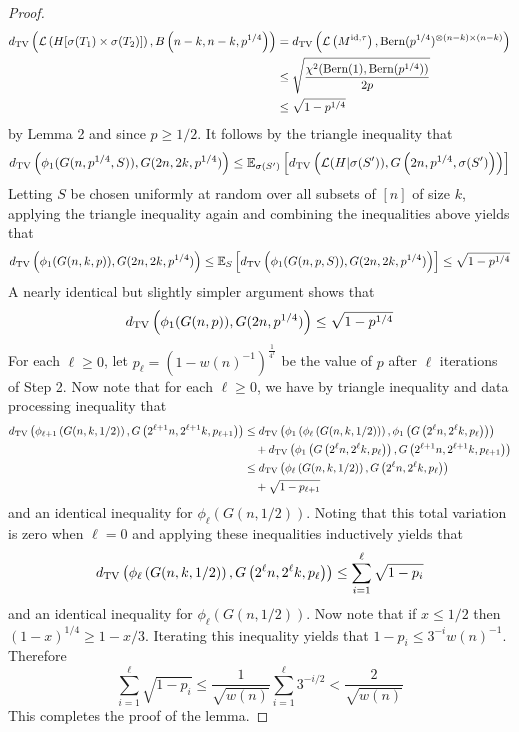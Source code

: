 \documentclass[11pt]{article}
\begin{document}
\begin{proof}
\begin{align*}
d_{\text{TV}}\left( \mathcal{L}\left(H[\sigma(T_1) \times \sigma(T_2)]\right), B\left(n - k, n - k, p^{1/4}\right) \right) &= d_{\text{TV}}\left( \mathcal{L}\left( M^{\text{id}, \tau} \right), \text{Bern}(p^{1/4})^{\otimes(n-k) \times (n-k)} \right) \\
&\le \sqrt{\frac{\chi^2(\text{Bern}(1), \text{Bern}(p^{1/4}))}{2p}} \\
&\le \sqrt{1-p^{1/4}}
\end{align*}
by Lemma 2 and since $p \ge 1/2$. It follows by the triangle inequality that
$$d_{\text{TV}}\left( \phi_1(G(n, p^{1/4}, S)), G(2n, 2k, p^{1/4}) \right) \le \mathbb{E}_{\sigma(S')} \left[ d_{\text{TV}}\left(\mathcal{L}(H | \sigma(S')), G\left(2n, p^{1/4}, \sigma(S')\right) \right) \right]$$
Letting $S$ be chosen uniformly at random over all subsets of $[n]$ of size $k$, applying the triangle inequality again and combining the inequalities above yields that
$$d_{\text{TV}}\left( \phi_1(G(n, k, p)), G(2n, 2k, p^{1/4}) \right) \le \mathbb{E}_S\left[ d_{\text{TV}}\left( \phi_1(G(n, p, S)), G(2n, 2k, p^{1/4}) \right) \right] \le\sqrt{1-p^{1/4}}$$
A nearly identical but slightly simpler argument shows that
$$d_{\text{TV}}\left( \phi_1(G(n, p)), G(2n, p^{1/4}) \right) \le \sqrt{1-p^{1/4}}$$
For each $\ell \ge 0$, let $p_\ell = \left(1 -w(n)^{-1}\right)^{\frac{1}{4^\ell}}$ be the value of $p$ after $\ell$ iterations of Step 2. Now note that for each $\ell \ge 0$, we have by triangle inequality and data processing inequality that
\begin{align*}
d_{\text{TV}}\left( \phi_{\ell + 1}\left(G(n, k, 1/2)\right), G\left(2^{\ell+1} n, 2^{\ell+1} k, p_{\ell+1} \right) \right) &\le d_{\text{TV}}\left( \phi_1\left(\phi_\ell\left(G(n, k, 1/2)\right) \right), \phi_1\left(G\left(2^\ell n, 2^\ell k, p_\ell \right) \right) \right) \\
&\quad + d_{\text{TV}}\left( \phi_1\left(G\left(2^\ell n, 2^\ell k, p_\ell \right) \right), G\left(2^{\ell+1} n, 2^{\ell+1} k, p_{\ell+1} \right) \right) \\
&\le d_{\text{TV}}\left( \phi_\ell\left(G(n, k, 1/2)\right), G\left(2^\ell n, 2^\ell k, p_\ell \right) \right) \\
&\quad + \sqrt{1-p_{\ell+1}}
\end{align*}
and an identical inequality for $\phi_\ell(G(n, 1/2))$. Noting that this total variation is zero when $\ell = 0$ and applying these inequalities inductively yields that
$$d_{\text{TV}}\left( \phi_\ell\left(G(n, k, 1/2)\right), G\left(2^\ell n, 2^\ell k, p_\ell \right) \right) \le \sum_{i = 1}^\ell \sqrt{1-p_{i}}$$
and an identical inequality for $\phi_\ell(G(n, 1/2))$. Now note that if $x \le 1/2$ then $(1 - x)^{1/4} \ge 1 - x/3$. Iterating this inequality yields that $1 - p_{i} \le 3^{-i} w(n)^{-1}$. Therefore
$$\sum_{i = 1}^\ell \sqrt{1-p_{i}} \le \frac{1}{\sqrt{w(n)}} \sum_{i = 1}^\ell 3^{-i/2} < \frac{2}{\sqrt{w(n)}}$$
This completes the proof of the lemma.
\end{proof}
\end{document}
